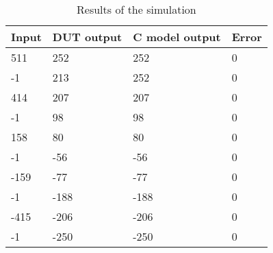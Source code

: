 \begin{table}[h]
\begin{center}
\begin{tabular}{|l|l|l|l|}
\hline
Input & DUT output & C model output & Error \\
\hline
511 & 252 & 252 & 0 \\
-1 & 213 & 252 & 0 \\
414 & 207 & 207 & 0 \\
-1 & 98 & 98 & 0 \\
158 & 80 & 80 & 0 \\
-1 & -56 & -56 & 0 \\
-159 & -77 & -77 & 0 \\
-1 & -188 & -188 & 0 \\
-415 & -206 & -206 & 0 \\
-1 & -250 & -250 & 0 \\
\hline
\end{tabular}
\end{center}
\caption{Results of the simulation}
\label{tab:tab_results}
\end{table}